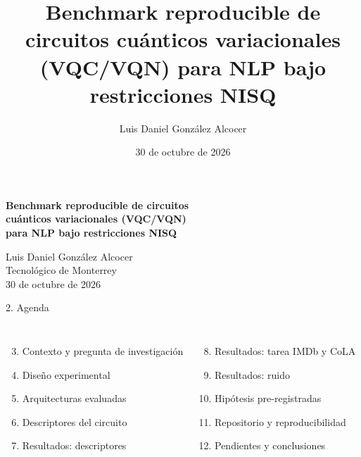 \documentclass[aspectratio=169,10pt]{beamer}
\title{Benchmark reproducible de circuitos cuánticos variacionales (VQC/VQN) para NLP bajo restricciones NISQ}
\author{Luis Daniel González Alcocer}
\date{30 de octubre de 2026}
\begin{document}
\begin{frame}
\vfill
\begin{tcolorbox}[colback=azul!12,colframe=azul!12,arc=4pt,halign=center,top=10pt,bottom=10pt]
{\Large\bfseries Benchmark reproducible de circuitos\\ cuánticos variacionales (VQC/VQN)\\ para NLP bajo restricciones NISQ}
\end{tcolorbox}
\vspace{1.5em}
\centering Luis Daniel González Alcocer\\[0.3em] Tecnológico de Monterrey\\[0.3em] 30 de octubre de 2026
\vfill
\end{frame}

\begin{frame}{2. Agenda}
\begin{columns}[T]
\begin{enumerate}\setcounter{enumi}{2}
\item Contexto y pregunta de investigación
\item Diseño experimental
\item Arquitecturas evaluadas
\item Descriptores del circuito
\item Resultados: descriptores
\end{enumerate}
\begin{enumerate}\setcounter{enumi}{7}
\item Resultados: tarea IMDb y CoLA
\item Resultados: ruido
\item Hipótesis pre-registradas
\item Repositorio y reproducibilidad
\item Pendientes y conclusiones
\end{enumerate}
\end{columns}
\end{frame}
\end{document}
